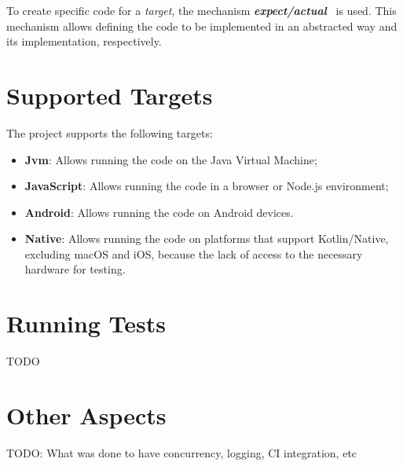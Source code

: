 To create specific code for a \textit{target}, the mechanism \textbf{\textit{expect/actual}}~\cite{kmp-expect-actual} is used.
This mechanism allows defining the code to be implemented in an abstracted way and its implementation, respectively.


\section{Supported Targets}\label{sec:supported-targets}

The project supports the following targets:

\begin{itemize}
    \item \textbf{Jvm}: Allows running the code on the Java Virtual Machine;
    \item \textbf{JavaScript}: Allows running the code in a browser or Node.js environment;
    \item \textbf{Android}: Allows running the code on Android devices.
    \item \textbf{Native}: Allows running the code on platforms that support Kotlin/Native, excluding macOS and iOS, because the lack of access to the necessary hardware for testing.
\end{itemize}

\section{Running Tests}\label{sec:running-tests}
TODO


\section{Other Aspects}\label{sec:other-aspects}
TODO: What was done to have concurrency, logging, CI integration, etc
